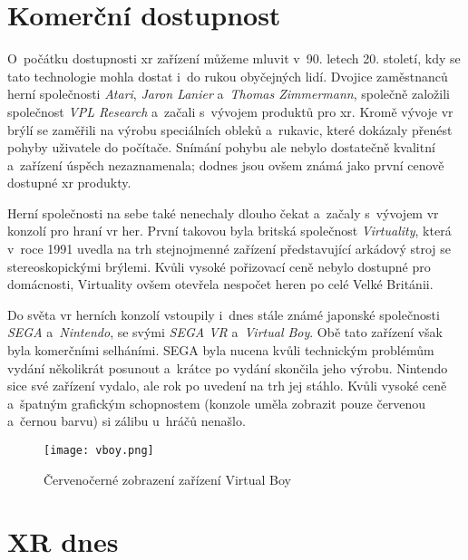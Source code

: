 \section{Komerční dostupnost}

O~počátku dostupnosti \gls{xr} zařízení můžeme mluvit v~90. letech 20. století, kdy se tato technologie mohla dostat i~do rukou obyčejných lidí. Dvojice zaměstnanců herní společnosti \textit{Atari}, \textit{Jaron Lanier} a~\textit{Thomas Zimmermann}, společně založili společnost \textit{VPL Research} a~začali s~vývojem produktů pro \gls{xr}. Kromě vývoje \gls{vr} brýlí se zaměřili na výrobu speciálních obleků a~rukavic, které dokázaly přenést pohyby uživatele do počítače. Snímání pohybu ale nebylo dostatečně kvalitní a~zařízení úspěch nezaznamenala; dodnes jsou ovšem známá jako první cenově dostupné \gls{xr} produkty. \cite{otechnice_2}

Herní společnosti na sebe také nenechaly dlouho čekat a~začaly s~vývojem \gls{vr} konzolí pro hraní \gls{vr} her. První takovou byla britská společnost \textit{Virtuality}, která v~roce 1991 uvedla na trh stejnojmenné zařízení představující arkádový stroj se stereoskopickými brýlemi. Kvůli vysoké pořizovací ceně nebylo dostupné pro domácnosti, Virtuality ovšem otevřela nespočet heren po celé Velké Británii. \cite{otechnice_2} \cite{independent_virtuality}

Do světa \gls{vr} herních konzolí vstoupily i~dnes stále známé japonské společnosti \textit{SEGA} a~\textit{Nintendo}, se svými \textit{SEGA VR} a~\textit{Virtual Boy}. Obě tato zařízení však byla komerčními selháními. SEGA byla nucena kvůli technickým problémům vydání několikrát posunout a~krátce po vydání skončila jeho výrobu. Nintendo sice své zařízení vydalo, ale rok po uvedení na trh jej stáhlo. Kvůli vysoké ceně a~špatným grafickým schopnostem (konzole uměla zobrazit pouze červenou a~černou barvu) si zálibu u~hráčů nenašlo.\cite{otechnice_2}

\begin{figure}[H]
    \centering
    \texttt{[image: vboy.png]}
    \caption{Červeno\textendash černé zobrazení zařízení Virtual Boy \cite{vboy}}
    \label{vboy_red_display}
\end{figure}

\section{XR dnes}

